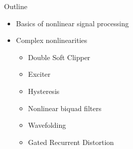 \begin{frame}{Outline}
    \begin{itemize}
        \item Basics of nonlinear signal processing
        \item Complex nonlinearities
        \begin{itemize}
            \item Double Soft Clipper
            \item Exciter
            \item Hysteresis
            \item Nonlinear biquad filters
            \item Wavefolding
            \item Gated Recurrent Distortion
        \end{itemize}
    \end{itemize}
\end{frame}
